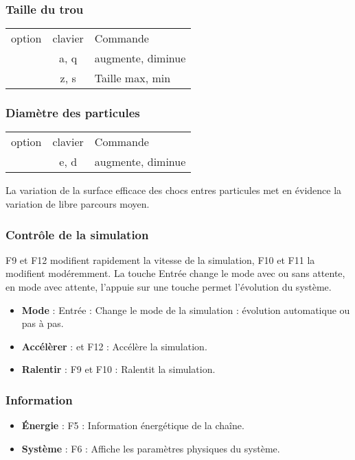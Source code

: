 \subsubsection{Taille du trou}
%
\begin{center}
\begin{tabular}{ccl}
option & clavier & Commande \\
& {\sf a},  {\sf q} & augmente, diminue\\
& {\sf z},  {\sf s} & Taille max, min\\
\end{tabular}
\end{center}
%
\subsubsection{Diamètre des particules}
%
\begin{center}
\begin{tabular}{ccl}
option & clavier & Commande \\
& {\sf e},  {\sf d} & augmente, diminue\\
\end{tabular}
\end{center}
%
La variation de la surface efficace des chocs entres particules met en évidence la variation de libre parcours moyen.
%
\subsubsection{Contrôle de la simulation}
%
{\sf F9} et {\sf F12} modifient rapidement la vitesse de la simulation, {\sf F10} et {\sf F11} la modifient modéremment. La touche {\sf Entrée} change le mode avec ou sans attente, en mode avec attente, l'appuie sur une touche permet l'évolution du système.
%
\begin{itemize}[label=, leftmargin=2cm, itemsep=0pt]
\item {\bf Mode} : {\sf Entrée} : Change le mode de la simulation : évolution automatique ou pas à pas.
\item {\bf Accélèrer} : {} et {\sf F12} : Accélère la simulation.
\item {\bf Ralentir} : {\sf F9} et {\sf F10} : Ralentit la simulation.
\end{itemize}
%
%
\subsubsection{Information}
\begin{itemize}[label=, leftmargin=2cm, itemsep=0pt]
\item {\bf Énergie} : {\sf F5} : Information énergétique de la chaîne.
\item {\bf Système} : {\sf F6} : Affiche les paramètres physiques du système.
\end{itemize}
%
